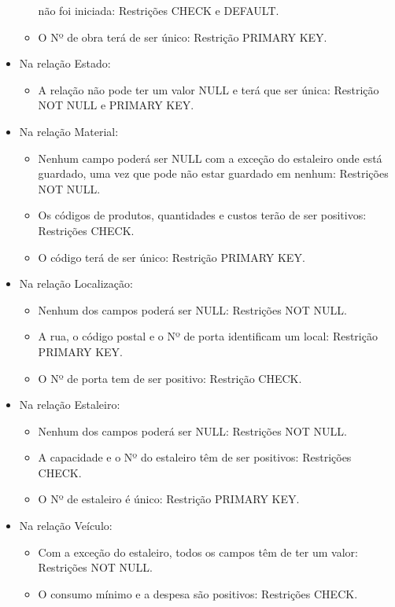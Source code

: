 \documentclass{report}
\begin{document}
\begin{itemize}
\begin{itemize}
				não foi iniciada: Restrições CHECK e DEFAULT.
				\item O Nº de obra terá de ser único: Restrição PRIMARY KEY.
			\end{itemize}
			\item Na relação Estado:
			\begin{itemize}
				\item A relação não pode ter um valor NULL e terá que ser única: Restrição NOT 
				NULL e PRIMARY KEY.		
			\end{itemize}
			\item Na relação Material:
			\begin{itemize}
				\item Nenhum campo poderá ser NULL com a exceção do estaleiro onde está 
				guardado, uma vez que pode não estar guardado em nenhum: Restrições NOT NULL.
				\item Os códigos de produtos, quantidades e custos terão de ser positivos: 
				Restrições CHECK.
				\item O código terá de ser único: Restrição PRIMARY KEY.
			\end{itemize}
			\item Na relação Localização:
			\begin{itemize}
				\item Nenhum dos campos poderá ser NULL: Restrições NOT NULL.
				\item A rua, o código postal e o Nº de porta identificam um local: Restrição 
				PRIMARY KEY.
				\item O Nº de porta tem de ser positivo: Restrição CHECK.
			\end{itemize}
			\item Na relação Estaleiro:
			\begin{itemize}
				\item Nenhum dos campos poderá ser NULL: Restrições NOT NULL.
				\item A capacidade e o Nº do estaleiro têm de ser positivos: Restrições CHECK.
				\item O Nº de estaleiro é único: Restrição PRIMARY KEY.
			\end{itemize}
			\item Na relação Veículo:
			\begin{itemize}
				\item Com a exceção do estaleiro, todos os campos têm de ter um valor: 
				Restrições NOT NULL.
				\item O consumo mínimo e a despesa são positivos: Restrições CHECK.

\end{itemize}
\end{itemize}
\end{document}
